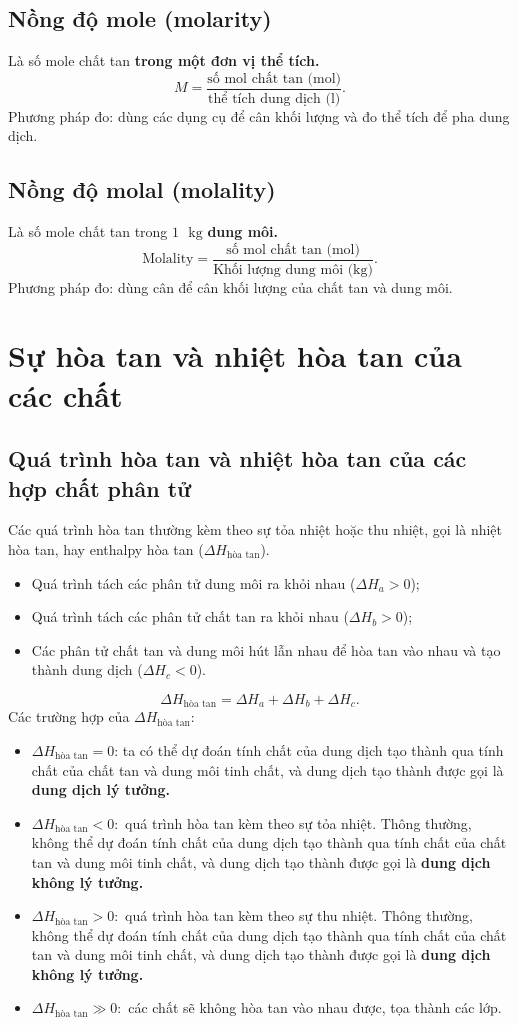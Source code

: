 \subsection{Nồng độ mole (molarity)}
Là số mole chất tan \textbf{trong một đơn vị thể tích.}
$$M = \frac{\text{số mol chất tan (mol)}}{\text{thể tích dung dịch (l)}}.$$
Phương pháp đo: dùng các dụng cụ để cân khối lượng và đo thể tích để pha dung dịch.
\subsection{Nồng độ molal (molality)}
Là số mole chất tan trong $1 \text{ } \mathrm{kg}$ \textbf{dung môi.}
$$\text{Molality} = \frac{\text{số mol chất tan (mol)}}{\text{Khối lượng dung môi (kg)}}.$$
Phương pháp đo: dùng cân để cân khối lượng của chất tan và dung môi.
\section{Sự hòa tan và nhiệt hòa tan của các chất}
\subsection{Quá trình hòa tan và nhiệt hòa tan của các hợp chất phân tử}
Các quá trình hòa tan thường kèm theo sự tỏa nhiệt hoặc thu nhiệt, gọi là nhiệt hòa tan, hay enthalpy hòa tan ($\Delta H_{\text{hòa tan}}$).
\begin{itemize}
\item Quá trình tách các phân tử dung môi ra khỏi nhau ($\Delta H_a > 0$);
\item Quá trình tách các phân tử chất tan ra khỏi nhau ($\Delta H_b > 0$);
\item Các phân tử chất tan và dung môi hút lẫn nhau để hòa tan vào nhau và tạo thành dung dịch ($\Delta H_c < 0$).
\end{itemize}
$$\Delta H_{\text{hòa tan}} = \Delta H_a + \Delta H_b + \Delta H_c.$$
Các trường hợp của $\Delta H_{\text{hòa tan}}$:
\begin{itemize}
\item $\Delta H_{\text{hòa tan}} = 0$: ta có thể dự đoán tính chất của dung dịch tạo thành qua tính chất của chất tan và dung môi tinh chất, và dung dịch tạo thành được gọi là \textbf{dung dịch lý tưởng.}
\item $\Delta H_{\text{hòa tan}} < 0:$ quá trình hòa tan kèm theo sự tỏa nhiệt. Thông thường, không thể dự đoán tính chất của dung dịch tạo thành qua tính chất của chất tan và dung môi tinh chất, và dung dịch tạo thành được gọi là \textbf{dung dịch không lý tưởng.}
\item $\Delta H_{\text{hòa tan}} > 0:$ quá trình hòa tan kèm theo sự thu nhiệt. Thông thường, không thể dự đoán tính chất của dung dịch tạo thành qua tính chất của chất tan và dung môi tinh chất, và dung dịch tạo thành được gọi là \textbf{dung dịch không lý tưởng.}
\item $\Delta H_{\text{hòa tan}} \gg 0:$ các chất sẽ không hòa tan vào nhau được, tọa thành các lớp.
\end{itemize}

